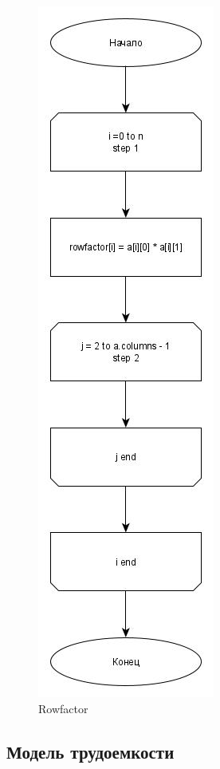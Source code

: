 \documentclass[a4paper, 14pt]{article}
\begin{document}
	\vspace{1cm}
	\newpage
	\begin{figure}[H]
		\centering
		\includegraphics[scale=0.5]{Схемы/rowfactor}
		\caption{Rowfactor}
		\label{fig:rowfactor}
	\end{figure}


	\subsection{Модель трудоемкости}
	
\end{document}
